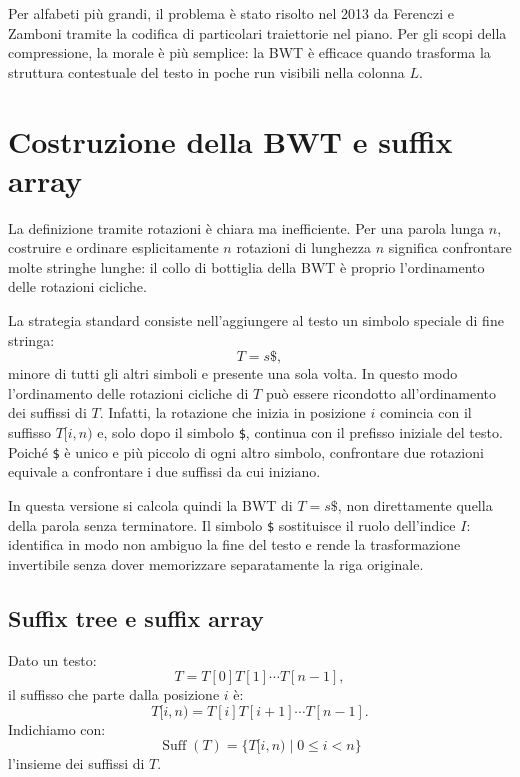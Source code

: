 \documentclass{article}
\theoremstyle{definition}
\numberwithin{equation}{section}
\begin{document}
Per alfabeti più grandi, il problema è stato risolto nel 2013 da Ferenczi e Zamboni tramite la codifica di particolari traiettorie nel piano. Per gli scopi della compressione, la morale è più semplice: la BWT è efficace quando trasforma la struttura contestuale del testo in poche run visibili nella colonna $L$.

\section{Costruzione della BWT e suffix array}
La definizione tramite rotazioni è chiara ma inefficiente. Per una parola lunga $n$, costruire e ordinare esplicitamente $n$ rotazioni di lunghezza $n$ significa confrontare molte stringhe lunghe: il collo di bottiglia della BWT è proprio l'ordinamento delle rotazioni cicliche.

La strategia standard consiste nell'aggiungere al testo un simbolo speciale di fine stringa:
\[
    T=s\texttt{\$},
\]
minore di tutti gli altri simboli e presente una sola volta. In questo modo l'ordinamento delle rotazioni cicliche di $T$ può essere ricondotto all'ordinamento dei suffissi di $T$. Infatti, la rotazione che inizia in posizione $i$ comincia con il suffisso $T[i,n)$ e, solo dopo il simbolo \texttt{\$}, continua con il prefisso iniziale del testo. Poiché \texttt{\$} è unico e più piccolo di ogni altro simbolo, confrontare due rotazioni equivale a confrontare i due suffissi da cui iniziano.

In questa versione si calcola quindi la BWT di $T=s\texttt{\$}$, non direttamente quella della parola senza terminatore. Il simbolo \texttt{\$} sostituisce il ruolo dell'indice $I$: identifica in modo non ambiguo la fine del testo e rende la trasformazione invertibile senza dover memorizzare separatamente la riga originale.

\subsection{Suffix tree e suffix array}
Dato un testo:
\[
    T=T[0]T[1]\cdots T[n-1],
\]
il suffisso che parte dalla posizione $i$ è:
\[
    T[i,n)=T[i]T[i+1]\cdots T[n-1].
\]
Indichiamo con:
\[
    \operatorname{Suff}(T)=\{T[i,n)\mid 0\leq i<n\}
\]
l'insieme dei suffissi di $T$.
\end{document}
